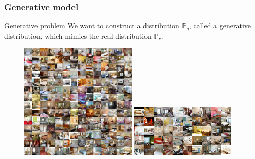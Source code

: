 \documentclass[french,9pt]{beamer}
\begin{document}
\begin{frame}
\frametitle{Generative model}

\begin{block}{Generative problem}
We want to construct a distribution $\mathbb{P}_{g}$, called a generative distribution, which mimics the real distribution $\mathbb{P}_{r}$.
\end{block}

\begin{figure}
  \begin{center}
    \includegraphics[width=0.5\textwidth]{fig/lsun_bedrooms_real.png}\hspace{1mm}
     \includegraphics[width=0.45\textwidth]{fig/lsun_bedrooms_five_epoch_samples.png}\hspace{1mm}
  \end{center}
  \caption{\cite{2015arXiv151106434R}}
\end{figure}

\end{frame}
\end{document}
